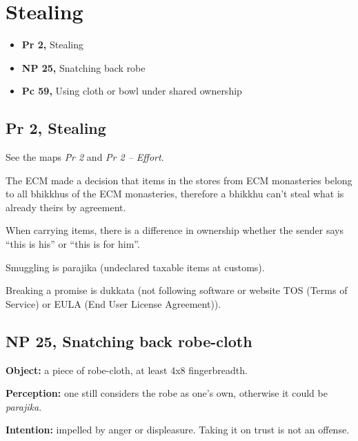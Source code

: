 \chapter{Stealing}

\begin{itemize}
\tightlist
\item
  \textbf{Pr 2,} Stealing
\item
  \textbf{NP 25,} Snatching back robe
\item
  \textbf{Pc 59,} Using cloth or bowl under shared ownership
\end{itemize}

\enlargethispage*{4\baselineskip}
\par
{}
\par
\vspace*{-2\baselineskip}

\section{Pr 2, Stealing}

See the maps \emph{Pr 2} and \emph{Pr 2 -- Effort}.

The ECM made a decision that items in the stores from ECM monasteries
belong to all bhikkhus of the ECM monasteries, therefore a bhikkhu can't
steal what is already theirs by agreement.

When carrying items, there is a difference in ownership whether the
sender says ``this is his'' or ``this is for him''.

Smuggling is parajika (undeclared taxable items at customs).

Breaking a promise is dukkata (not following software or website TOS
(Terms of Service) or EULA (End User License Agreement)).

\section{NP 25, Snatching back robe-cloth}

\textbf{Object:} a piece of robe-cloth, at least 4x8 fingerbreadth.

\textbf{Perception:} one still considers the robe as one's own,
otherwise it could be \emph{parajika}.

\textbf{Intention:} impelled by anger or displeasure. Taking it on trust
is not an offense.

